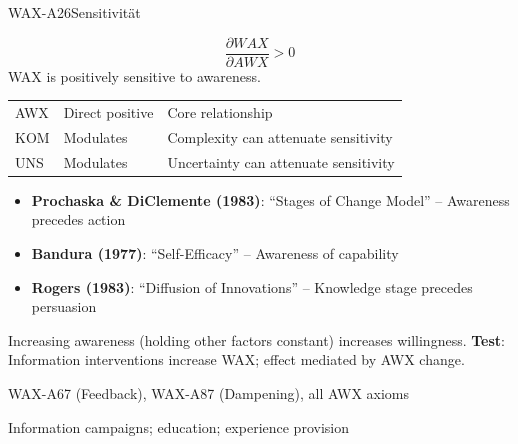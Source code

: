 \begin{axiomspec}{WAX-A26}{Sensitivität}

\begin{equation}
\frac{\partial WAX}{\partial AWX} > 0
\end{equation}
WAX is positively sensitive to awareness.

\begin{tabular}{lll}
AWX & Direct positive & Core relationship \\
KOM & Modulates & Complexity can attenuate sensitivity \\
UNS & Modulates & Uncertainty can attenuate sensitivity \\
\end{tabular}

\begin{itemize}
\item \textbf{Prochaska \& DiClemente (1983)}: ``Stages of Change Model'' -- Awareness precedes action
\item \textbf{Bandura (1977)}: ``Self-Efficacy'' -- Awareness of capability
\item \textbf{Rogers (1983)}: ``Diffusion of Innovations'' -- Knowledge stage precedes persuasion
\end{itemize}

Increasing awareness (holding other factors constant) increases willingness.
\textbf{Test}: Information interventions increase WAX; effect mediated by AWX change.

WAX-A67 (Feedback), WAX-A87 (Dampening), all AWX axioms

Information campaigns; education; experience provision

\end{axiomspec}




